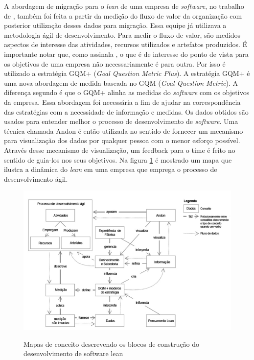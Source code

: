 A abordagem de migração para o \textit{lean} de uma empresa de \textit{software}, no trabalho de , também foi feita a partir da medição do fluxo de valor da organização com posterior utilização desses dados para migração. Essa equipe já utilizava a metodologia ágil de desenvolvimento. Para medir o fluxo de valor, são medidos aspectos de interesse das atividades, recursos utilizados e artefatos produzidos. É importante notar que, como assinala , o que é de interesse do ponto de vista para os objetivos de uma empresa não necessariamente é para outra. Por isso é utilizado a estratégia GQM+ (\textit{Goal Question Metric Plus}). A estratégia GQM+ é uma nova abordagem de medida baseada no GQM (\textit{Goal Question Metric}). A diferença segundo  é que o GQM+ alinha as medidas do \textit{software} com os objetivos da empresa. Essa abordagem foi necessária a fim de ajudar na correspondência das estratégias com a necessidade de informação e medidas. Os dados obtidos são usados para entender melhor o processo de desenvolvimento de \textit{software}. Uma técnica chamada Andon é então utilizada no sentido de fornecer um mecanismo para visualização dos dados por qualquer pessoa com o menor esforço possível. Através desse mecanismo de visualização, um feedback para o time é feito no sentido de guia-los nos seus objetivos. Na figura \ref{fig:01} é mostrado um mapa que ilustra a dinâmica do \textit{lean} em uma empresa que emprega o processo de desenvolvimento ágil.

\begin{figure}[hb]
\begin{center}
\caption{Mapas de conceito descrevendo os blocos de construção do desenvolvimento de software lean}
\label{fig:01}
\includegraphics[width=15cm]{assets/figura1} \\
\end{center}
\end{figure}


